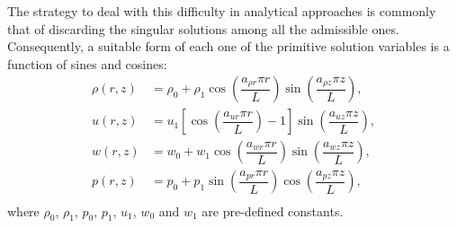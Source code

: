 \documentclass[a4paper,10pt]{article}
\begin{document}
\begin{landscape}
The strategy to deal with this difficulty in analytical approaches is commonly that of discarding the singular solutions among all the admissible ones. %
Consequently, a suitable form of each one of the primitive solution variables is a function of sines and cosines:
\begin{equation}
 \label{eq:manufactured01}
\begin{split}
\rho(r,z)&= \rho_0 + \rho_1 \cos\left(\dfrac{a_{\rho r} \pi r}{L}\right) \sin\left(\dfrac{a_{\rho z} \pi z}{L}\right) ,\\
u(r,z)&=u_1 \left[\cos\left(\dfrac{a_{ur} \pi r}{L}\right)-1\right] \sin\left(\dfrac{a_{uz} \pi z}{L}\right) ,\\
w(r,z)&=w_0 + w_1 \cos\left(\dfrac{a_{wr} \pi r}{L}\right) \sin\left(\dfrac{a_{wz} \pi z}{L}\right) ,\\
p(r,z)&=p_0 + p_1 \sin\left(\dfrac{a_{pr} \pi r}{L}\right) \cos\left(\dfrac{a_{pz} \pi z}{L}\right), \\
\end{split}
\end{equation}
%
where $\rho_0$, $\rho_1$, $p_0$, $p_1$, $u_1$, $w_0$ and $w_1$ are pre-defined constants.


\end{landscape}
\end{document}
